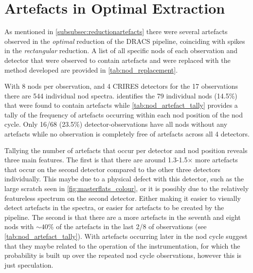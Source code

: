 
\chapter{Artefacts in Optimal Extraction}
\label{appendix:artefacts}





As mentioned in \cref{subsubsec:reductionartefacts} there were several artefacts observed in the \emph{optimal} reduction of the {DRACS} pipeline, coinciding with spikes in the \emph{rectangular} reduction.
A list of all specific nods of each observation and detector that were observed to contain artefacts and were replaced with the method developed are provided in \cref{tab:nod_replacement}.

With 8 nods per observation, and 4 {CRIRES} detectors for the 17 observations there are 544 individual nod spectra.
 identifies the 79 individual nods (14.5\%) that were found to contain artefacts while \cref{tab:nod_artefact_tally} provides a tally of the frequency of artefacts occurring within each nod position of the nod cycle.
Only 16/68 (23.5\%) detector-observations have all nods without any artefacts while no observation is completely free of artefacts across all 4 detectors.

Tallying the number of artefacts that occur per detector and nod position reveals three main features. The first is that there are around 1.3-1.5$\times$ more artefacts that occur on the second detector compared to the other three detectors individually.
This maybe due to a physical defect with this detector, such as the large scratch seen in \cref{fig:masterflats_colour}, or it is possibly due to the relatively featureless spectrum on the second detector.
Either making it easier to visually detect artefacts in the spectra, or easier for artefacts to be created by the pipeline.
The second is that there are a more artefacts in the seventh and eight nods with $\sim40$\% of the artefacts in the last 2/8 of observations (see \cref{tab:nod_artefact_tally}).
With artefacts occurring later in the nod cycle suggest that they maybe related to the operation of the instrumentation, for which the probability is built up over the repeated nod cycle observations, however this is just speculation.


